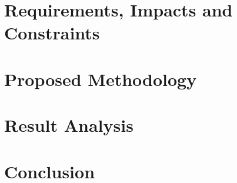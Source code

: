 \documentclass[Times,12pt,oneside,openany,print,index]{report}
\begin{document}
\chapter{Requirements, Impacts and Constraints
}



\chapter{Proposed Methodology}
\label{ch:methodology}


\chapter{Result Analysis}
\label{ch:results}





\chapter{Conclusion}

\printbibliography %
\end{document}
